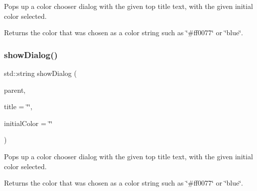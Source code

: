 Pops up a color chooser dialog with the given top title text, with the given initial color selected. 

Returns the color that was chosen as a color string such as \char`\"{}\#ff0077\char`\"{} or \char`\"{}blue\char`\"{}. \mbox{\label{classsgl_1_1GColorChooser_ab17d15e0eeebb06c853c197a63949d13}} 
\subsubsection{\texorpdfstring{show\+Dialog()}{showDialog()}\hspace{0.1cm}{\footnotesize\ttfamily [6/6]}}
{\footnotesize\ttfamily std\+::string show\+Dialog (\begin{DoxyParamCaption}\item[{Q\+Widget $\ast$}]{parent,  }\item[{const std\+::string \&}]{title = {\ttfamily \char`\"{}\char`\"{}},  }\item[{const std\+::string \&}]{initial\+Color = {\ttfamily \char`\"{}\char`\"{}} }\end{DoxyParamCaption})\hspace{0.3cm}{\ttfamily [static]}}



Pops up a color chooser dialog with the given top title text, with the given initial color selected. 

Returns the color that was chosen as a color string such as \char`\"{}\#ff0077\char`\"{} or \char`\"{}blue\char`\"{}. 